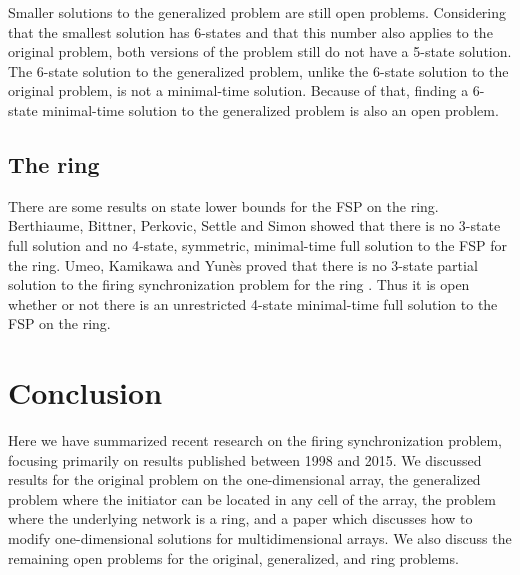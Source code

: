 \documentclass{article}
\begin{document}
Smaller solutions to the generalized problem are still open problems. Considering that the smallest solution has 6-states and that this number also applies to the original problem, both versions of the problem still do not have a 5-state solution. The 6-state solution to the generalized problem, unlike the 6-state solution to the original problem, is not a minimal-time solution. Because of that, finding a 6-state minimal-time solution to the generalized problem is also an open problem.

\subsection{The ring}

There are some results on state lower bounds for the FSP on the ring.
Berthiaume, Bittner, Perkovic, Settle and Simon showed that there is no 3-state full solution and no 4-state, symmetric, minimal-time full solution to the FSP for the ring\cite{berthiaume2004bounding}. Umeo, Kamikawa and Yun\`{e}s proved that there is no 3-state partial solution to the firing synchronization problem for the ring \cite{umeo2009family}. Thus it is open whether or not there is an unrestricted 4-state minimal-time full solution to the FSP on the ring.





 


\section{Conclusion}
Here we have summarized recent research on the firing synchronization problem, focusing primarily on results published between 1998 and 2015. We discussed results for the original problem on the one-dimensional array, the generalized problem where the initiator can be located in any cell of the array, the problem where the underlying network is a ring, and a paper which discusses how to modify one-dimensional solutions for multidimensional arrays. We also discuss the remaining open problems for the original, generalized, and ring problems.
\end{document}
